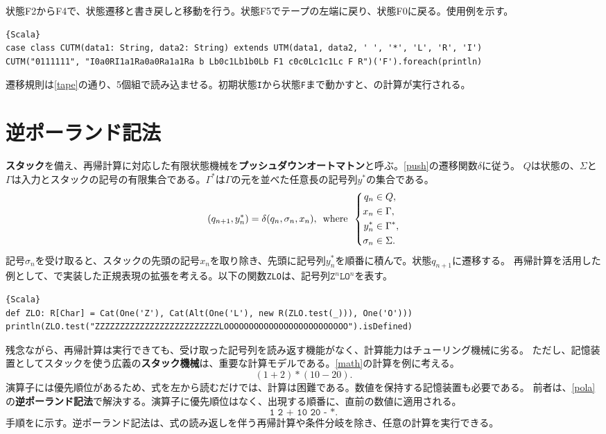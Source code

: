 \documentclass[10pt,a4paper]{book}
\begin{document}
状態F2からF4で、状態遷移と書き戻しと移動を行う。状態F5でテープの左端に戻り、状態F0に戻る。使用例を示す。

\begin{Verbatim}{Scala}
case class CUTM(data1: String, data2: String) extends UTM(data1, data2, ' ', '*', 'L', 'R', 'I')
CUTM("0111111", "I0a0RI1a1Ra0a0Ra1a1Ra b Lb0c1Lb1b0Lb F1 c0c0Lc1c1Lc F R")('F').foreach(println)
\end{Verbatim}

遷移規則は\eqref{tape}の通り、5個組で読み込ませる。初期状態\texttt{I}から状態\texttt{F}まで動かすと、の計算が実行される。

\section{逆ポーランド記法\label{sect:pola}}

\textbf{スタック}を備え、再帰計算に対応した有限状態機械を\textbf{プッシュダウンオートマトン}と呼ぶ。\eqref{push}の遷移関数$\delta$に従う。
$Q$は状態の、$\Sigma$と$\Gamma$は入力とスタックの記号の有限集合である。$\Gamma^*$は$\Gamma$の元を並べた任意長の記号列$y^*$の集合である。
%
\begin{equation}
\label{eq:push}
(q_{n+1},y^*_n) = \delta(q_n,\sigma_n,x_n),
\enspace\mathrm{where}\enspace
\left\{
\begin{aligned}
q_n &\in Q,\\
x_n &\in \Gamma,\\
y^*_n &\in \Gamma^*,\\
\sigma_n &\in \Sigma.
\end{aligned}
\right.
\end{equation}
%
記号$\sigma_n$を受け取ると、スタックの先頭の記号$x_n$を取り除き、先頭に記号列$y^*_n$を順番に積んで。状態$q_{n+1}$に遷移する。
再帰計算を活用した例として、で実装した正規表現の拡張を考える。以下の関数\texttt{ZLO}は、記号列$\texttt{Z}^n\texttt{L}\texttt{O}^n$を表す。

\begin{Verbatim}{Scala}
def ZLO: R[Char] = Cat(One('Z'), Cat(Alt(One('L'), new R(ZLO.test(_))), One('O')))
println(ZLO.test("ZZZZZZZZZZZZZZZZZZZZZZZZZLOOOOOOOOOOOOOOOOOOOOOOOOO").isDefined)
\end{Verbatim}

残念ながら、再帰計算は実行できても、受け取った記号列を読み返す機能がなく、計算能力はチューリング機械に劣る。
ただし、記憶装置としてスタックを使う広義の\textbf{スタック機械}は、重要な計算モデルである。\eqref{math}の計算を例に考える。
%
\begin{equation}
\label{eq:math}
(1 + 2) * (10 - 20).
\end{equation}
%
演算子には優先順位があるため、式を左から読むだけでは、計算は困難である。数値を保持する記憶装置も必要である。
前者は、\eqref{pola}の\textbf{逆ポーランド記法}で解決する。演算子に優先順位はなく、出現する順番に、直前の数値に適用される。
%
\begin{equation}
\label{eq:pola}
\texttt{1 2 + 10 20 - *}.
\end{equation}
%
手順をに示す。逆ポーランド記法は、式の読み返しを伴う再帰計算や条件分岐を除き、任意の計算を実行できる。
\end{document}
